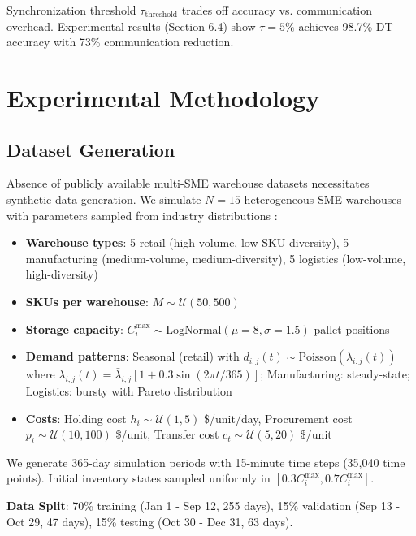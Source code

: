 \documentclass[times,10pt,twocolumn]{jucs2e}
\begin{document}
Synchronization threshold $\tau_{\text{threshold}}$ trades off accuracy vs. communication overhead. Experimental results (Section 6.4) show $\tau = 5\%$ achieves 98.7\% DT accuracy with 73\% communication reduction.


\section{Experimental Methodology}

\subsection{Dataset Generation}

Absence of publicly available multi-SME warehouse datasets necessitates synthetic data generation. We simulate $N = 15$ heterogeneous SME warehouses with parameters sampled from industry distributions \cite{Davis2023,Garcia2024}:

\begin{itemize}
\item \textbf{Warehouse types}: 5 retail (high-volume, low-SKU-diversity), 5 manufacturing (medium-volume, medium-diversity), 5 logistics (low-volume, high-diversity)
\item \textbf{SKUs per warehouse}: $M \sim \mathcal{U}(50, 500)$
\item \textbf{Storage capacity}: $C_i^{\max} \sim \text{LogNormal}(\mu = 8, \sigma = 1.5)$ pallet positions
\item \textbf{Demand patterns}: Seasonal (retail) with $d_{i,j}(t) \sim \text{Poisson}(\lambda_{i,j}(t))$ where $\lambda_{i,j}(t) = \bar{\lambda}_{i,j} [1 + 0.3 \sin(2\pi t / 365)]$; Manufacturing: steady-state; Logistics: bursty with Pareto distribution
\item \textbf{Costs}: Holding cost $h_i \sim \mathcal{U}(1, 5)$ \$/unit/day, Procurement cost $p_i \sim \mathcal{U}(10, 100)$ \$/unit, Transfer cost $c_t \sim \mathcal{U}(5, 20)$ \$/unit
\end{itemize}

We generate 365-day simulation periods with 15-minute time steps (35,040 time points). Initial inventory states sampled uniformly in $[0.3 C_i^{\max}, 0.7 C_i^{\max}]$.

\textbf{Data Split}: 70\% training (Jan 1 - Sep 12, 255 days), 15\% validation (Sep 13 - Oct 29, 47 days), 15\% testing (Oct 30 - Dec 31, 63 days).
\end{document}
